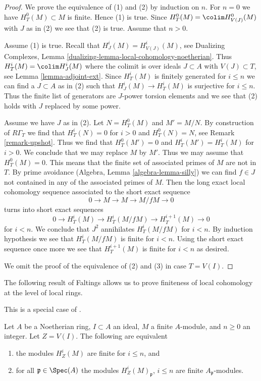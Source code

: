 \begin{proof}
We prove the equivalence of (1) and (2) by induction on $n$.
For $n = 0$ we have $H^0_T(M) \subset M$ is finite. Hence (1) is true.
Since $H^0_T(M) = \colim H^0_{V(J)}(M)$ with $J$ as in (2) we see
that (2) is true. Assume that $n > 0$.

\medskip\noindent
Assume (1) is true. Recall that $H^i_J(M) = H^i_{V(J)}(M)$, see
Dualizing Complexes, Lemma \ref{dualizing-lemma-local-cohomology-noetherian}.
Thus $H^i_T(M) = \colim H^i_J(M)$ where the colimit is over ideals
$J \subset A$ with $V(J) \subset T$, see
Lemma \ref{lemma-adjoint-ext}. Since $H^i_T(M)$ is finitely generated
for $i \leq n$ we can find a $J \subset A$ as in (2) such that
$H^i_J(M) \to H^i_T(M)$ is surjective for $i \leq n$.
Thus the finite list of generators are $J$-power torsion elements
and we see that (2) holds with $J$ replaced by some power.

\medskip\noindent
Assume we have $J$ as in (2). Let $N = H^0_T(M)$ and $M' = M/N$.
By construction of $R\Gamma_T$ we find that
$H^i_T(N) = 0$ for $i > 0$ and $H^0_T(N) = N$, see
Remark \ref{remark-upshot}. Thus we find that
$H^0_T(M') = 0$ and $H^i_T(M') = H^i_T(M)$ for $i > 0$.
We conclude that we may replace $M$ by $M'$.
Thus we may assume that $H^0_T(M) = 0$.
This means that the finite set of associated primes of $M$
are not in $T$. By prime avoidance (Algebra, Lemma \ref{algebra-lemma-silly})
we can find $f \in J$ not contained in any of the associated primes of $M$.
Then the long exact local cohomology sequence associated to the short
exact sequence
$$
0 \to M \to M \to M/fM \to 0
$$
turns into short exact sequences
$$
0 \to H^i_T(M) \to H^i_T(M/fM) \to H^{i + 1}_T(M) \to 0
$$
for $i < n$. We conclude that $J^2$ annihilates $H^i_T(M/fM)$
for $i < n$. By induction hypothesis we see that $H^i_T(M/fM)$
is finite for $i < n$. Using the short exact sequence once more
we see that $H^{i + 1}_T(M)$ is finite for $i < n$ as desired.

\medskip\noindent
We omit the proof of the equivalence of (2) and (3)
in case $T = V(I)$.
\end{proof}

\noindent
The following result of Faltings allows us to prove finiteness
of local cohomology at the level of local rings.

\begin{lemma}
\label{lemma-check-finiteness-local-cohomology-locally}
\begin{reference}
This is a special case of \cite[Satz 1]{Faltings-finiteness}.
\end{reference}
Let $A$ be a Noetherian ring, $I \subset A$ an ideal, $M$ a finite
$A$-module, and $n \geq 0$ an integer. Let $Z = V(I)$.
The following are equivalent
\begin{enumerate}
\item the modules $H^i_Z(M)$ are finite for $i \leq n$, and
\item for all $\mathfrak p \in \Spec(A)$ the modules
$H^i_Z(M)_\mathfrak p$, $i \leq n$ are finite $A_\mathfrak p$-modules.
\end{enumerate}
\end{lemma}

